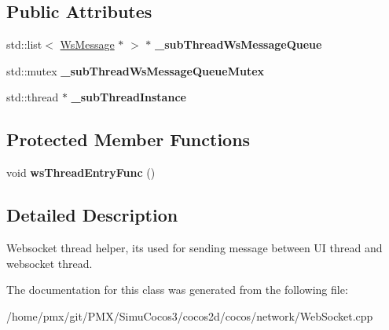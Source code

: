\subsection*{Public Attributes}
\begin{DoxyCompactItemize}
\item 
\mbox{\label{classWsThreadHelper_a7e4b8e288776aedbbb7374d2d02a1512}} 
std\+::list$<$ \hyperlink{classWsMessage}{Ws\+Message} $\ast$ $>$ $\ast$ {\bfseries \+\_\+sub\+Thread\+Ws\+Message\+Queue}
\item 
\mbox{\label{classWsThreadHelper_a76e9bbb8cb0d73f4480bcfc5b97018c7}} 
std\+::mutex {\bfseries \+\_\+sub\+Thread\+Ws\+Message\+Queue\+Mutex}
\item 
\mbox{\label{classWsThreadHelper_a4c6bc79fd7aa61251ddedd405d0d94d7}} 
std\+::thread $\ast$ {\bfseries \+\_\+sub\+Thread\+Instance}
\end{DoxyCompactItemize}
\subsection*{Protected Member Functions}
\begin{DoxyCompactItemize}
\item 
\mbox{\label{classWsThreadHelper_a76cdbf75f011ce54eaf400154593d70c}} 
void {\bfseries ws\+Thread\+Entry\+Func} ()
\end{DoxyCompactItemize}


\subsection{Detailed Description}
Websocket thread helper, it\textquotesingle{}s used for sending message between UI thread and websocket thread. 

The documentation for this class was generated from the following file\+:\begin{DoxyCompactItemize}
\item 
/home/pmx/git/\+P\+M\+X/\+Simu\+Cocos3/cocos2d/cocos/network/Web\+Socket.\+cpp\end{DoxyCompactItemize}

